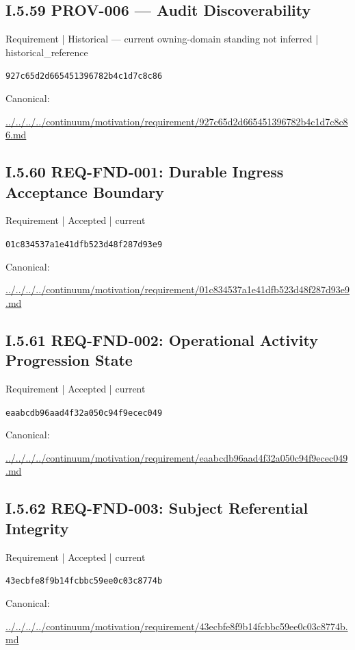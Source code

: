 \documentclass[10pt,a4paper]{article}
\begin{document}
\subsection*{I.5.59 PROV-006 — Audit Discoverability}
{\small Requirement | Historical — current owning-domain standing not inferred | historical\_reference}\par
\texttt{927c65d2d665451396782b4c1d7c8c86}\par
Canonical: \par
{\footnotesize\url{../../../../continuum/motivation/requirement/927c65d2d665451396782b4c1d7c8c86.md}}\par
\subsection*{I.5.60 REQ-FND-001: Durable Ingress Acceptance Boundary}
{\small Requirement | Accepted | current}\par
\texttt{01c834537a1e41dfb523d48f287d93e9}\par
Canonical: \par
{\footnotesize\url{../../../../continuum/motivation/requirement/01c834537a1e41dfb523d48f287d93e9.md}}\par
\subsection*{I.5.61 REQ-FND-002: Operational Activity Progression State}
{\small Requirement | Accepted | current}\par
\texttt{eaabcdb96aad4f32a050c94f9ecec049}\par
Canonical: \par
{\footnotesize\url{../../../../continuum/motivation/requirement/eaabcdb96aad4f32a050c94f9ecec049.md}}\par
\subsection*{I.5.62 REQ-FND-003: Subject Referential Integrity}
{\small Requirement | Accepted | current}\par
\texttt{43ecbfe8f9b14fcbbc59ee0c03c8774b}\par
Canonical: \par
{\footnotesize\url{../../../../continuum/motivation/requirement/43ecbfe8f9b14fcbbc59ee0c03c8774b.md}}\par
\end{document}

